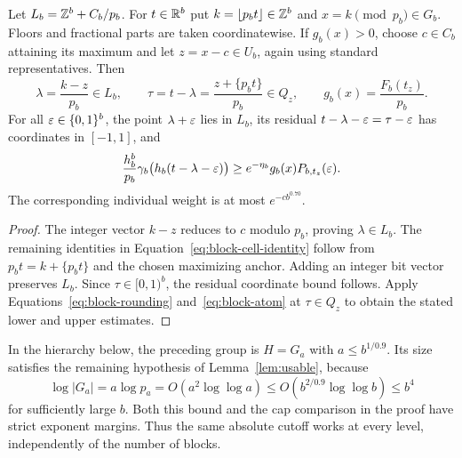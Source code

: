 \begin{lemma}
\label{lem:block-cell}
Let $L_b=\mathbb Z^b+C_b/p_b$.  For $t\in\mathbb R^b$ put
$k=\lfloor p_b t\rfloor\in\mathbb Z^b$ and $x=k\pmod{p_b}\in G_b$.
Floors and fractional parts are taken coordinatewise.
If $g_b(x)>0$, choose $c\in C_b$ attaining its maximum and let
$z=x-c\in U_b$, again using standard representatives.  Then
\begin{equation}
 \lambda=\frac{k-z}{p_b}\in L_b,\qquad
 \tau=t-\lambda=\frac{z+\{p_b t\}}{p_b}\in Q_z,\qquad
 g_b(x)=\frac{F_b(t_z)}{p_b}.
 \label{eq:block-cell-identity}
\end{equation}
For all $\varepsilon\in\{0,1\}^b$, the point $\lambda+\varepsilon$ lies in $L_b$,
its residual $t-\lambda-\varepsilon=\tau-\varepsilon$ has coordinates in $[-1,1]$,
and
\begin{equation}
 \frac{h_b^b}{p_b}\gamma_b\bigl(h_b(t-\lambda-\varepsilon)\bigr)
       \ge e^{-\eta_b}g_b(x)P_{b,t_z}(\varepsilon).
 \label{eq:block-cell-lower}
\end{equation}
The corresponding individual weight is at most $e^{-c b^{0.70}}$.
\end{lemma}

\begin{proof}
The integer vector $k-z$ reduces to $c$ modulo $p_b$, proving
$\lambda\in L_b$.  The remaining identities in
Equation~\eqref{eq:block-cell-identity} follow from
$p_b t=k+\{p_b t\}$ and the chosen maximizing anchor.  Adding an integer
bit vector preserves $L_b$.  Since $\tau\in[0,1)^b$, the residual
coordinate bound follows.  Apply
Equations~\eqref{eq:block-rounding} and~\eqref{eq:block-atom} at
$\tau\in Q_z$ to obtain the stated lower and upper estimates.
\end{proof}

In the hierarchy below, the preceding group is $H=G_a$ with
$a\le b^{1/0.9}$.  Its size satisfies the remaining hypothesis of
Lemma~\ref{lem:usable}, because
\[
 \log|G_a|=a\log p_a=O(a^2\log\log a)
       \le O(b^{2/0.9}\log\log b)\le b^4
\]
for sufficiently large $b$.  Both this bound and the cap comparison in
the proof have strict exponent margins.  Thus the same absolute cutoff
works at every level, independently of the number of blocks.
